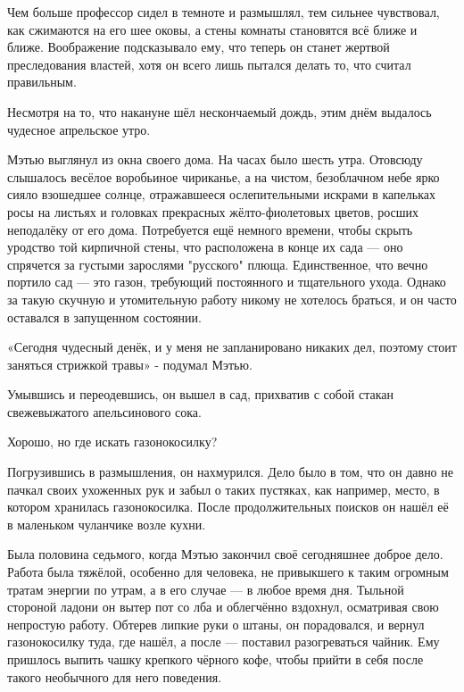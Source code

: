\documentclass[a4paper,12pt]{book}
\begin{document}
\par
Чем больше профессор сидел в темноте и размышлял, тем сильнее чувствовал, как сжимаются на его шее оковы, а стены комнаты становятся всё ближе и ближе. Воображение подсказывало ему, что теперь он станет жертвой преследования властей, хотя он всего лишь пытался делать то, что считал правильным.\\
\par
Несмотря на то, что накануне шёл нескончаемый дождь, этим днём выдалось чудесное апрельское утро.
\par
Мэтью выглянул из окна своего дома. На часах было шесть утра. Отовсюду слышалось весёлое воробьиное чириканье, а на чистом, безоблачном небе ярко сияло взошедшее солнце, отражавшееся ослепительными искрами в капельках росы на листьях и головках прекрасных жёлто-фиолетовых цветов, росших неподалёку от его дома. Потребуется ещё немного времени, чтобы скрыть уродство той кирпичной стены, что расположена в конце их сада — оно спрячется за густыми зарослями "русского" плюща. Единственное, что вечно портило сад — это газон, требующий постоянного и тщательного ухода. Однако за такую скучную и утомительную работу никому не хотелось браться, и он часто оставался в запущенном состоянии.
\par
«Сегодня чудесный денёк, и у меня не запланировано никаких дел, поэтому стоит заняться стрижкой травы» - подумал Мэтью.
\par
Умывшись и переодевшись, он вышел в сад, прихватив с собой стакан свежевыжатого апельсинового сока.
\par
Хорошо, но где искать газонокосилку?
\par
Погрузившись в размышления, он нахмурился. Дело было в том, что он давно не пачкал своих ухоженных рук и забыл о таких пустяках, как например, место, в котором хранилась газонокосилка. После продолжительных поисков он нашёл её в маленьком чуланчике возле кухни.\\
\par
Была половина седьмого, когда Мэтью закончил своё сегодняшнее доброе дело. Работа была тяжёлой, особенно для человека, не привыкшего к таким огромным тратам энергии по утрам, а в его случае — в любое время дня. Тыльной стороной ладони он вытер пот со лба и облегчённо вздохнул, осматривая свою непростую работу. Обтерев липкие руки о штаны, он порадовался, и вернул газонокосилку туда, где нашёл, а после — поставил разогреваться чайник. Ему пришлось выпить чашку крепкого чёрного кофе, чтобы прийти в себя после такого необычного для него поведения.
\par
\end{document}
